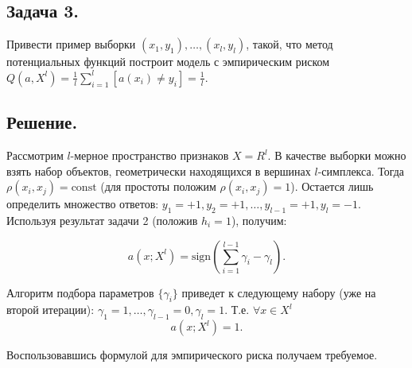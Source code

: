 \subsection*{Задача 3.}

Привести пример выборки $(x_1, y_1),\dots,(x_l, y_l)$, такой, что метод потенциальных функций построит модель с эмпирическим риском $ Q(a,X^l) = \frac{1}{l} \sum\limits_{i=1}^{l} [a(x_i) \neq y_i] = \frac{1}{l}$.

\subsection*{Решение.}

Рассмотрим $l$-мерное пространство признаков $X=R^l$. В качестве выборки можно взять набор объектов, геометрически находящихся в вершинах $l$-симплекса. Тогда $\rho(x_i, x_j) = \text{const}$ (для простоты положим $\rho(x_i, x_j) = 1$). Остается лишь определить множество ответов: $y_1=+1, y_2=+1, \dots, y_{l-1}=+1, y_l=-1$. Используя результат задачи 2 (положив $h_i=1$), получим:

\begin{equation*}
	\displaystyle a(x; X^l) =  \text{sign} ( \sum\limits_{i=1}^{l-1} \gamma_i - \gamma_l).
\end{equation*}

Алгоритм подбора параметров $\{\gamma_i\}$ приведет к следующему набору (уже на второй итерации): $\gamma_1=1, \dots, \gamma_{l-1}=0, \gamma_l=1$. Т.е. $\forall x \in X^l$ 
\begin{equation*}
	\displaystyle a(x; X^l) = 1.
\end{equation*}

Воспользовавшись формулой для эмпирического риска получаем требуемое.
